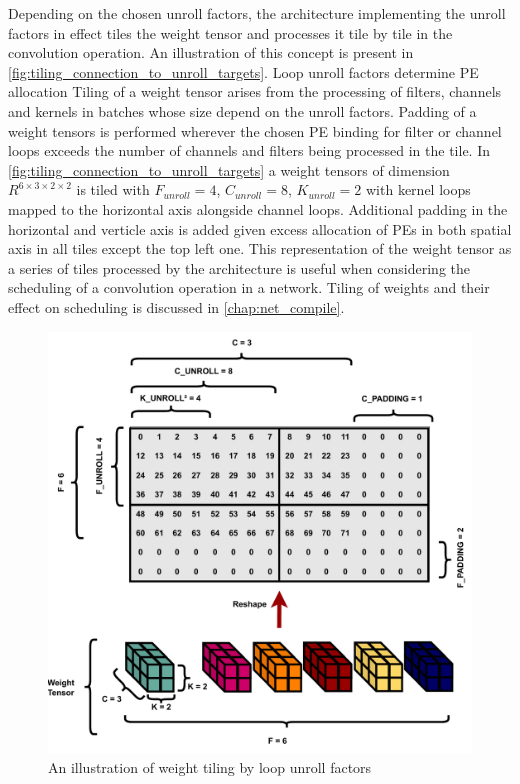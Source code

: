 Depending on the chosen unroll factors, the architecture implementing the unroll
factors in effect tiles the weight tensor and processes it tile by tile in the
convolution operation. An
illustration of this concept is present in
\autoref{fig:tiling_connection_to_unroll_targets}. Loop unroll factors determine
PE allocation 
Tiling of a weight tensor arises from the processing of filters, channels and
kernels in batches whose size depend on the unroll factors. 
Padding of a weight tensors is performed wherever the chosen PE
binding for filter or channel loops exceeds the number of channels and filters
being processed in the tile. In
\autoref{fig:tiling_connection_to_unroll_targets} a weight tensors of dimension
$R^{6\times 3\times 2\times 2}$ is tiled with $F_{unroll} = 4$, $C_{unroll}=8$,
$K_{unroll}=2$ with kernel loops mapped to the horizontal axis alongside channel
loops. Additional padding in the horizontal and verticle axis is added given
excess allocation of PEs in both spatial axis in all tiles except the top left
one. This representation of the weight tensor as a series of tiles processed by
the architecture is useful when considering the scheduling of a convolution
operation in a network. Tiling of weights and their effect on scheduling is
discussed in \autoref{chap:net_compile}.

\begin{figure}[]
    \centering
    \includegraphics[scale=0.5]{fig/tiling.pdf}
    \caption{An illustration of weight tiling by loop unroll factors}
    \label{fig:tiling_connection_to_unroll_targets}
\end{figure}


